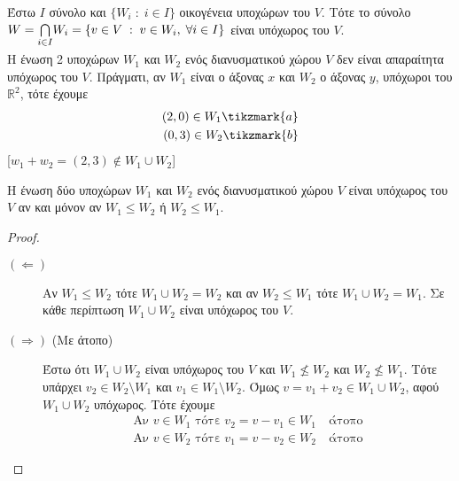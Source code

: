 \begin{prop}
\item {}
    Έστω $ I $ σύνολο και $ \{ W_{i} \; : \; i \in I \}$ οικογένεια υποχώρων του $V$. 
    Τότε το σύνολο $ W = \smash{\bigcap\limits_{i \in I}} W_{i} = \{ v \in V \; : \; v \in W_{i}, \; \forall i \in I \} $ είναι υπόχωρος του $V$.
\end{prop}

\begin{rem}
\item {}
    Η ένωση 2 υποχώρων $ W_{1} $ και $ W_{2} $ ενός διανυσματικού χώρου $V$ δεν είναι 
    απαραίτητα υπόχωρος του $V$. Πράγματι, αν $ W_{1} $ είναι ο άξονας $x$ και 
    $ W_{2} $ ο άξονας $y$, υπόχωροι του $ \mathbb{R}^{2} $, τότε έχουμε
    \begin{align*}
        (2,0) \in W_{1} \tikzmark{a} \\
        (0,3) \in W_{2} \tikzmark{b} 
    \end{align*} 
    [$ w_{1}+w_{2} = (2,3) \not \in W_{1} \cup W_{2} $]
\end{rem}

\begin{prop}
\item {}
    Η ένωση δύο υποχώρων $ W_{1} $ και $ W_{2} $ ενός διανυσματικού χώρου $V$ 
    είναι υπόχωρος του $V$ αν και μόνον αν $ W_{1} \leq W_{2} $ ή $ W_{2} \leq W_{1} $.
\end{prop}
\begin{proof}
\item {}
    \begin{description}
        \item [$(\Leftarrow)$] Αν $ W_{1} \leq W_{2} $ τότε $ W_{1} \cup W_{2} = W_{2} $
            και αν $ W_{2} \leq W_{1} $ τότε $ W_{1} \cup W_{2} = W_{1} $. 
            Σε κάθε περίπτωση $ W_{1} \cup W_{2} $ είναι υπόχωρος του $V$.
        \item [$(\Rightarrow)$ (Με άτοπο)]  Έστω ότι $ W_{1} \cup W_{2} $ είναι 
            υπόχωρος του $V$ και $ W_{1} \not \leq W_{2} $ και $ W_{2} \not \leq 
            W_{1}$. Τότε υπάρχει $ v_{2} \in W_{2} \setminus W_{1} $ και $ v_{1} \in 
            W_{1} \setminus W_{2}$. Όμως $ v = v_{1}+v_{2} \in W_{1} \cup W_{2} $, 
            αφού $ W_{1} \cup W_{2} $ υπόχωρος. Τότε έχουμε 
            \begin{align*}
                \text{Αν $v \in W_{1}$ τότε} \; v_{2}=v-v_{1} \in W_{1} 
                \quad \text{άτοπο} \\
                \text{Αν $v \in W_{2}$ τότε} \; v_{1}=v-v_{2} \in W_{2} 
                \quad \text{άτοπο}  
            \end{align*}
    \end{description}
\end{proof}


